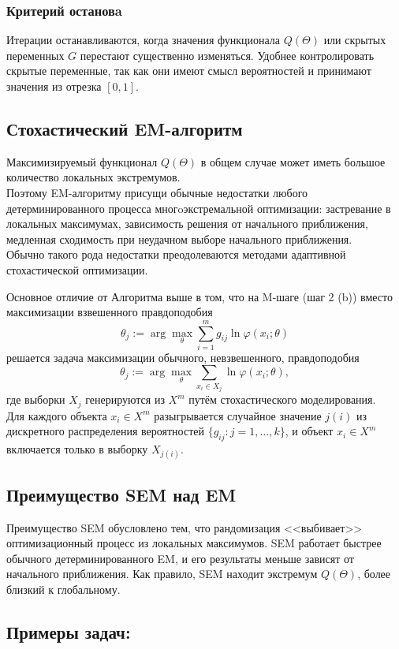 \subsubsection*{Критерий остановa}
Итерации останавливаются, когда значения функционала $Q(\Theta)$ или скрытых переменных $G$ перестают существенно изменяться. Удобнее контролировать скрытые переменные, так как они имеют смысл вероятностей и принимают значения из отрезка $[0, 1]$.
\newpage
\subsection*{Стохастический EM-алгоритм}
Максимизируемый функционал $Q(\Theta)$ в общем случае может иметь большое количество локальных экстремумов. \\ 
Поэтому EM-алгоритму присущи обычные недостатки любого детерминированного процесса многoэкстремальной оптимизации: застревание в локальных максимумах, зависимость решения от начального приближения, медленная сходимость при неудачном выборе начального приближения.\\ Обычно такого рода недостатки преодолеваются методами адаптивной стохастической оптимизации.

Основное отличие от Алгоритма выше в том, что на M-шаге (шаг 2 (b)) вместо максимизации взвешенного правдоподобия
\[
\theta_j := \arg \max_{\theta} \sum_{i=1}^m g_{ij} \ln \varphi(x_i; \theta)
\]
решается задача максимизации обычного, невзвешенного, правдоподобия
\[
\theta_j := \arg \max_{\theta} \sum_{x_i \in X_j} \ln \varphi(x_i; \theta),
\]
где выборки $X_j$ генерируются из $X^m$ путём стохастического моделирования.\\
Для каждого объекта $x_i \in X^m$ разыгрывается случайное значение $j(i)$ из дискретного распределения вероятностей $\{g_{ij} : j = 1, \dots, k\}$,  и объект  $x_i \in X^m$ включается
только в выборку $X_{j(i)}$.

\subsection*{Преимущество SEM над EM}
Преимущество SEM обусловлено тем, что рандомизация <<выбивает>> оптимизационный процесс из локальных максимумов. SEM работает быстрее обычного детерминированного EM, и его результаты меньше зависят от начального приближения. Как правило, SEM находит экстремум $Q(\Theta)$, более близкий к глобальному.

\newpage

\subsection*{Примеры задач: }

